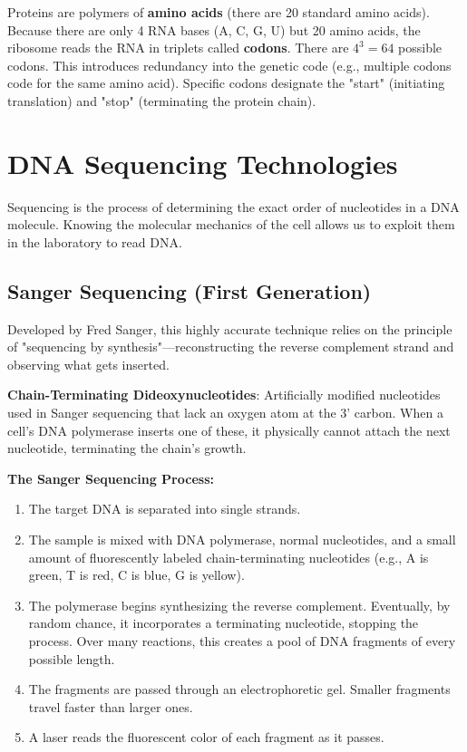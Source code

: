 \documentclass[11pt, a4paper]{article}
\begin{document}
Proteins are polymers of \textbf{amino acids} (there are 20 standard amino acids). Because there are only 4 RNA bases (A, C, G, U) but 20 amino acids, the ribosome reads the RNA in triplets called \textbf{codons}. 
There are \(4^3 = 64\) possible codons. This introduces redundancy into the genetic code (e.g., multiple codons code for the same amino acid). Specific codons designate the "start" (initiating translation) and "stop" (terminating the protein chain).

\section{DNA Sequencing Technologies}

Sequencing is the process of determining the exact order of nucleotides in a DNA molecule. Knowing the molecular mechanics of the cell allows us to exploit them in the laboratory to read DNA. 

\subsection{Sanger Sequencing (First Generation)}

Developed by Fred Sanger, this highly accurate technique relies on the principle of "sequencing by synthesis"—reconstructing the reverse complement strand and observing what gets inserted.

\begin{important}
    \textbf{Chain-Terminating Dideoxynucleotides}: Artificially modified nucleotides used in Sanger sequencing that lack an oxygen atom at the 3' carbon. When a cell's DNA polymerase inserts one of these, it physically cannot attach the next nucleotide, terminating the chain's growth.
\end{important}

\textbf{The Sanger Sequencing Process:}
\begin{enumerate}
    \item The target DNA is separated into single strands.
    \item The sample is mixed with DNA polymerase, normal nucleotides, and a small amount of fluorescently labeled chain-terminating nucleotides (e.g., A is green, T is red, C is blue, G is yellow).
    \item The polymerase begins synthesizing the reverse complement. Eventually, by random chance, it incorporates a terminating nucleotide, stopping the process. Over many reactions, this creates a pool of DNA fragments of every possible length.
    \item The fragments are passed through an electrophoretic gel. Smaller fragments travel faster than larger ones.
    \item A laser reads the fluorescent color of each fragment as it passes. 
\end{enumerate}
\end{document}
